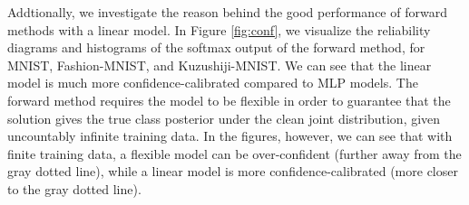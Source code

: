 \documentclass{article}
\begin{document}
Addtionally, we investigate the reason behind the good performance of forward methods with a linear model.  In Figure \ref{fig:conf}, we visualize the reliability diagrams  \cite{confcalibration} and histograms of the softmax output of the forward method, for MNIST, Fashion-MNIST, and Kuzushiji-MNIST.  We can see that the linear model is much more confidence-calibrated compared to MLP models.  The forward method requires the model to be flexible in order to guarantee that the solution gives the true class posterior under the clean joint distribution, given uncountably infinite training data.  In the figures, however, we can see that with finite training data, a flexible model can be over-confident (further away from the gray dotted line), while a linear model is more confidence-calibrated (more closer to the gray dotted line).
\end{document}
